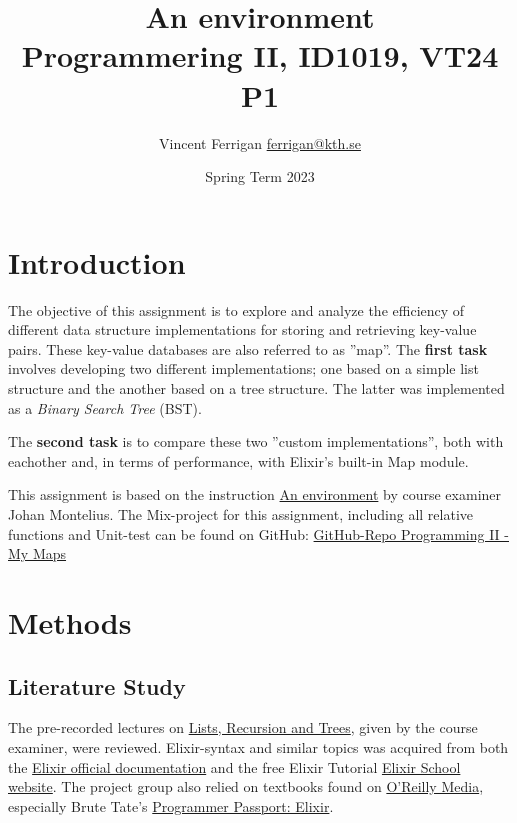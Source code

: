 \documentclass[a4paper,11pt]{article}
\begin{document}
\title{
    An environment
\\\small{Programmering II, ID1019, VT24 P1}
}
\author{Vincent Ferrigan \href{mailto:ferrigan@kth.se}{ferrigan@kth.se}}

\date{Spring Term 2023}

\maketitle

\section*{Introduction}
\label{sec:introduction}
The objective of this assignment is to explore and analyze
the efficiency of
different data structure implementations for storing
and retrieving key-value pairs.
These key-value databases are also referred to as ''map''.
The \textbf{first task} involves developing two different implementations;
one based on a simple list structure and the
another based on a tree structure.
The latter was implemented as a \emph{Binary Search Tree} (BST).

The \textbf{second task} is to compare these two ''custom implementations'',
both with eachother and, in terms of performance, with
Elixir's built-in Map module.

This assignment is based on the instruction
\href{https://people.kth.se/~johanmon/courses/id1019/seminars/environment/environment.pdf}{An environment}
by course examiner Johan Montelius.
The Mix-project for this assignment, including all relative functions and Unit-test can be found on GitHub:
\href{https://github.com/VincentFerrigan/kth-id1019-programming-ii/tree/main/tasks/2/mymaps}{GitHub-Repo Programming II - My Maps}%

\section*{Methods}
\label{sec:methods}

\subsection*{Literature Study}
\label{subsec:methods}
The pre-recorded lectures on
\href{https://canvas.kth.se/courses/44911/assignments/syllabus}{Lists, Recursion and Trees},
given by the course examiner, were reviewed.
Elixir-syntax and similar topics was acquired
from both the
\href{https://elixir-lang.org/docs.html}{Elixir official documentation}
and the free Elixir Tutorial
\href{https://elixirschool.com/en}{Elixir School
website}.
The project group also relied on textbooks found on
\href{https://learning.oreilly.com}{O'Reilly Media},
especially Brute Tate's
\href{https://learning.oreilly.com/library/view/programmer-passport-elixir/9781680509649/}{Programmer Passport: Elixir}.
\end{document}
